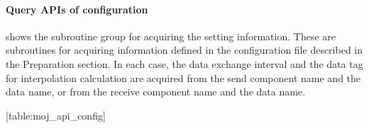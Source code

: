 \hypertarget{query-apis-of-configuration}{%
\paragraph{Query APIs of
configuration}\label{query-apis-of-configuration}}

shows the subroutine group for acquiring the setting information. These
are subroutines for acquiring information defined in the configuration
file described in the Preparation section. In each case, the data
exchange interval and the data tag for interpolation calculation are
acquired from the send component name and the data name, or from the
receive component name and the data name.

\protect\hypertarget{table:moj_api_config}{}{{[}table:moj\_api\_config{]}}

